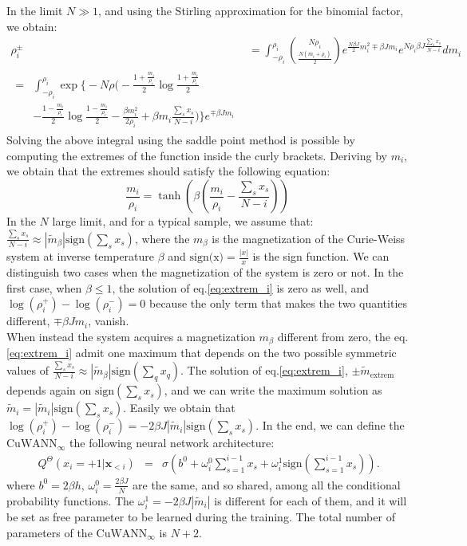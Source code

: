 In the limit $N \gg 1$, and using the Stirling approximation for the binomial factor, we obtain:
 \begin{align}
 \rho_i^{\pm} & = 
  \int_{-\rho_i}^{\rho_i} \binom{N\rho_i}{\frac{N(m_i+\rho_i)}{2}} e^{\frac{N \beta J}{2}m_i^{2} \mp \beta J m_i } e^{N \rho_i \beta J \frac{\sum_s x_s}{N-i}} dm_i \\
\begin{split} 
  = & \int_{-\rho_i}^{\rho_i} \exp\bigg\{-N\rho\big( -\frac{1+\frac{m_i}{\rho_i}}{2} \log\frac{1+\frac{m_i}{\rho_i}}{2} \\
   & - \frac{1-\frac{m_i}{\rho_i}}{2} \log\frac{1-\frac{m_i}{\rho_i}}{2} 
      - \frac{\beta m_i^2}{2 \rho_i} + \beta m_i \frac{\sum_s x_s}{N-i}\big) \bigg\} e^{\mp \beta J m_i}
\end{split}
\end{align}
Solving the above integral using the saddle point method is possible by computing the extremes of the function inside the curly brackets. Deriving by $m_i$, we obtain that the extremes should satisfy the following equation:
\begin{equation}
\frac{m_i}{\rho_i} = \tanh \left( \beta(\frac{m_i}{\rho_i} - \frac{\sum_s x_s}{N-i}) \right)
\label{eq:extrem_i}
\end{equation}
In the $N$ large limit, and for a typical sample, we assume that: $\frac{\sum_s x_s}{N-i} \approx |\tilde{m}_{\beta}| \text{sign}(\sum_s x_s)$, where the $m_{\beta}$ is the magnetization of the Curie-Weiss system at inverse temperature $\beta$ and $\text{sign(x)} = \frac{|x|}{x}$ is the sign function.
We can distinguish two cases when the magnetization of the system is zero or not. 
In the first case, when $\beta\leq 1$, the solution of eq.\ref{eq:extrem_i} is zero as well, and $\log(\rho_i^{+}) - \log(\rho_i^{-})=0$ because the only term that makes the two quantities different, $\mp \beta J m_i$, vanish.\\ 
When instead the system acquires a magnetization $m_{\beta}$ different from zero, the eq.\ref{eq:extrem_i} admit one maximum that depends on the two possible symmetric values of $\frac{\sum_s x_s}{N-i}\approx |\tilde{m}_{\beta}| \text{sign}(\sum_q x_q)$. 
The solution of eq.\ref{eq:extrem_i}, $\pm \tilde{m}_{\text{extrem}}$ depends again on $\text{sign}(\sum_s x_s)$, and we can write the maximum solution as $\tilde{m}_{i}=|\tilde{m}_i| \text{sign}(\sum_s x_s)$. 
Easily we obtain that $\log(\rho_i^{+}) - \log(\rho_i^{-}) = -2\beta J|\tilde{m}_i| \text{sign}(\sum_s x_s)$. 
In the end, we can define the $\text{CuWANN}_{\infty}$ the following neural network architecture:
\begin{eqnarray}\
\label{eq:curie_weiss_cond2}
Q^{\Theta}\left(x_{i}=+1|\mathbf{x}_{<i}\right) & = & \sigma \left(b^0+\omega_{i}^0\sum_{s=1}^{i-1}x_{s} + \omega_i^1 \text{sign}(\sum_{s=1}^{i-1}x_{s})\right).
\end{eqnarray}
where $b^0=2\beta h$, $\omega^0_i = \frac{2\beta J}{N}$ are the same, and so shared, among all the conditional probability functions. The $\omega^1_i = -2\beta J |\tilde{m}_i|$ is different for each of them, and it will be set as free parameter to be learned during the training. The total number of parameters of the $\text{CuWANN}_{\infty}$ is $N+2$.

